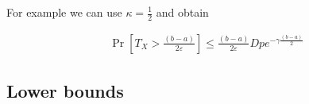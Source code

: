 \documentclass[12pt, a4paper]{article}
\theoremstyle{remark}
\begin{document}
For example we can use $\kappa = \frac{1}{2}$ and obtain

\begin{align*}
    \Pr\left[T_X > \frac{(b - a)}{2\varepsilon}\right] \leq \frac{(b - a)}{2\varepsilon} D p e^{-\gamma\frac{(b - a)}{2}}
\end{align*}

\subsection{Lower bounds}












\end{document}
